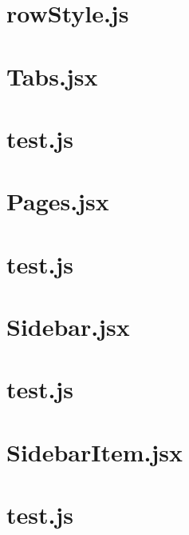 \documentclass[a4paper,landscape]{report}
\begin{document}
\newpage
\section{rowStyle.js}


\newpage
\section{Tabs.jsx}


\newpage
\section{test.js}


\newpage
\section{Pages.jsx}


\newpage
\section{test.js}


\newpage
\section{Sidebar.jsx}


\newpage
\section{test.js}


\newpage
\section{SidebarItem.jsx}


\newpage
\section{test.js}

\end{document}
